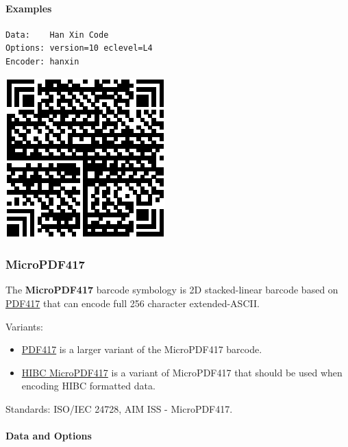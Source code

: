 \hypertarget{examples-9}{%
\paragraph{Examples}\label{examples-9}}

\begin{verbatim}
Data:    Han Xin Code
Options: version=10 eclevel=L4
Encoder: hanxin
\end{verbatim}

\includegraphics{images/hanxin-1.eps}

\hypertarget{micropdf417}{%
\subsubsection{MicroPDF417}\label{micropdf417}}

The \textbf{MicroPDF417} barcode symbology is 2D stacked-linear barcode
based on \protect\hyperlink{pdf417}{PDF417} that can encode full 256
character extended-ASCII.

Variants:

\begin{itemize}
\tightlist
\item
  \protect\hyperlink{pdf417}{PDF417} is a larger variant of the
  MicroPDF417 barcode.
\item
  \protect\hyperlink{hibc-symbols}{HIBC MicroPDF417} is a variant of
  MicroPDF417 that should be used when encoding HIBC formatted data.
\end{itemize}

Standards: ISO/IEC 24728, AIM ISS - MicroPDF417.

\hypertarget{data-and-options-13}{%
\paragraph{Data and Options}\label{data-and-options-13}}

